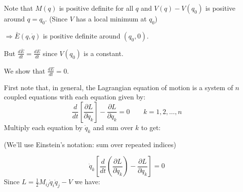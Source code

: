 \documentclass[twoside,10pt,a4paper]{article}
\begin{document}
Note that $M(q)$ is positive definite for all $q$ and $V(q) - V(q_0)$ is positive around $q=q_0$. (Since $V$ has a local minimum at $q_0$)

$\Longrightarrow \bar{E}(q,\dot{q})$ is positive definite around $(q_0,0)$.

But $\displaystyle \frac{d\bar{E}}{dt} = \frac{dE}{dt}$ since $V(q_0)$ is a constant.

We show that $\displaystyle \frac{dE}{dt}=0$.

First note that, in general, the Lagrangian equation of motion is a system of $n$ coupled equations with each equation given by:
\begin{equation*}
	\frac{d}{dt} \left[ \frac{\partial L}{\partial \dot{q}_k} \right] - \frac{\partial L}{\partial q_k} =0 \qquad k = 1,2,\ldots,n
\end{equation*}
Multiply each equation by $\dot{q}_k$ and sum over $k$ to get:

{\color{red} (We'll use Einstein's notation: sum over repeated indices)}

\begin{equation}\label{S03E041}
	\dot{q}_k \left[ \frac{d}{dt}\left( \frac{\partial L}{\partial \dot{q}_k} \right) - \frac{\partial L}{\partial q_k} \right] =0
\end{equation}
Since $\displaystyle L = \frac{1}{2}M_{ij}\dot{q}_i \dot{q}_j - V$ we have:
\end{document}
